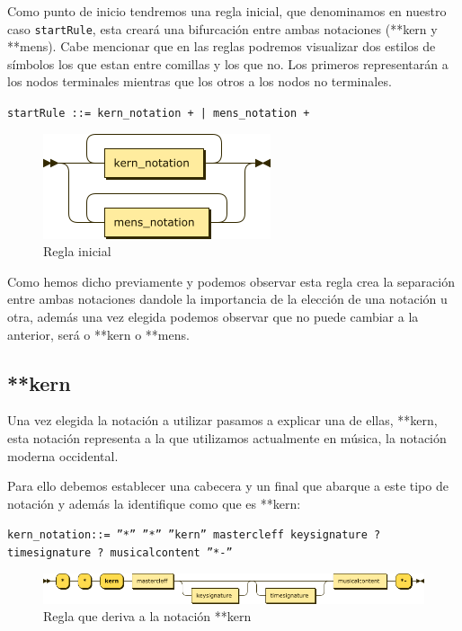 \documentclass{article}
\begin{document}
    Como punto de inicio tendremos una regla inicial, que denominamos en nuestro caso \texttt{startRule}, esta creará una
    bifurcación entre ambas notaciones (**kern y **mens).
    Cabe mencionar que en las reglas podremos visualizar dos estilos de símbolos los que estan entre comillas y los que no.
    Los primeros representarán a los nodos terminales mientras que los otros a los nodos no terminales.
    \begin{table}[H]
        \centering
        \texttt{startRule ::= kern\_notation + | mens\_notation +}
    \end{table}

    \begin{figure}[H]
        \centering
        \includegraphics{figures_railroad/png/skern/startRule.png}
        \caption{Regla inicial}
    \end{figure}

    Como hemos dicho previamente y podemos observar esta regla crea la separación entre ambas notaciones dandole la importancia
    de la elección de una notación u otra, además una vez elegida podemos observar que no puede cambiar a la anterior, será
    o **kern o **mens.

    \subsection{**kern}
    Una vez elegida la notación a utilizar pasamos a explicar una de ellas, **kern, esta notación representa a la que utilizamos
    actualmente en música, la notación moderna occidental.

    Para ello debemos establecer una cabecera y un final que abarque a este tipo de notación y además la identifique como
    que es **kern:

    \begin{table}[H]
        \texttt{kern\_notation::= ''*'' ''*'' ''kern'' mastercleff keysignature ? timesignature ? musicalcontent ''*-''}
    \end{table}

    \begin{figure}[H]
    \centering
        \includegraphics[scale = 0.55]{figures_railroad/png/skern/kern_notation.png}
        \caption{Regla que deriva a la notación **kern}
    \end{figure}
\end{document}
